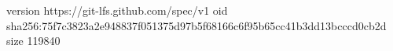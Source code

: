 version https://git-lfs.github.com/spec/v1
oid sha256:75f7c3823a2e948837f051375d97b5f68166c6f95b65cc41b3dd13bcccd0cb2d
size 119840
